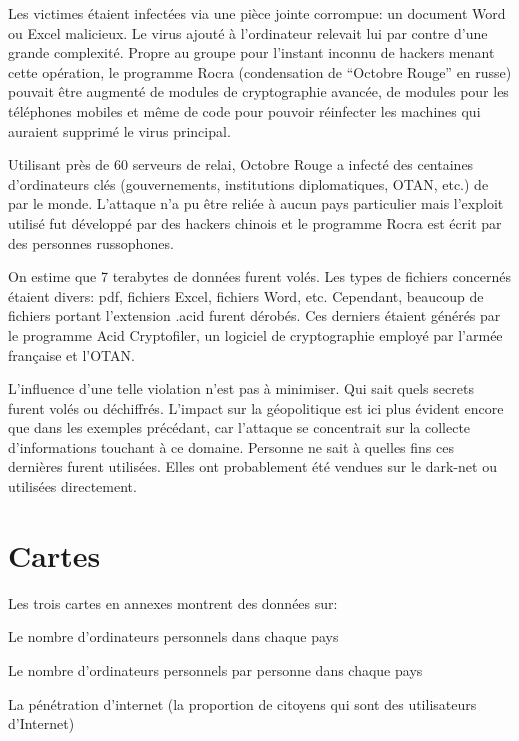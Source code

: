 \documentclass[article, french]{yReport}
\begin{document}
	Les victimes étaient infectées via une pièce jointe corrompue: un document Word ou Excel malicieux. Le virus ajouté à l'ordinateur relevait lui par contre d'une grande complexité. Propre au groupe pour l'instant inconnu de hackers menant cette opération, le programme Rocra  (condensation de \enquote{Octobre Rouge} en russe) pouvait être augmenté de modules de cryptographie avancée, de modules pour les téléphones mobiles et même de code pour pouvoir réinfecter les machines qui auraient supprimé le virus principal.
	
	Utilisant près de 60 serveurs de relai, Octobre Rouge a infecté des centaines d'ordinateurs clés (gouvernements, institutions diplomatiques, OTAN, etc.) de par le monde. L'attaque n'a pu être reliée à aucun pays particulier mais l'exploit utilisé fut développé par des hackers chinois et le programme Rocra est écrit par des personnes russophones.
	
	On estime que 7 terabytes de données furent volés. Les types de fichiers concernés étaient divers: pdf, fichiers Excel, fichiers Word, etc. Cependant, beaucoup de fichiers portant l'extension .acid furent dérobés. Ces derniers étaient générés par le programme Acid Cryptofiler, un logiciel de cryptographie employé par l'armée française et l'OTAN.
	
	L'influence d'une telle violation n'est pas à minimiser. Qui sait quels secrets furent volés ou déchiffrés. L'impact sur la géopolitique est ici plus évident encore que dans les exemples précédant, car l'attaque se concentrait sur la collecte d'informations touchant à ce domaine. Personne ne sait à quelles fins ces dernières furent utilisées. Elles ont probablement été vendues sur le dark-net ou utilisées directement.
	
	\newpage
	\section{Cartes}
	Les trois cartes en annexes montrent des données sur:
	\begin{items}
		\item Le nombre d'ordinateurs personnels dans chaque pays
		\item Le nombre d'ordinateurs personnels par personne dans chaque pays
		\item La pénétration d'internet (la proportion de citoyens qui sont des utilisateurs d'Internet)
	\end{items}
	
\end{document}
